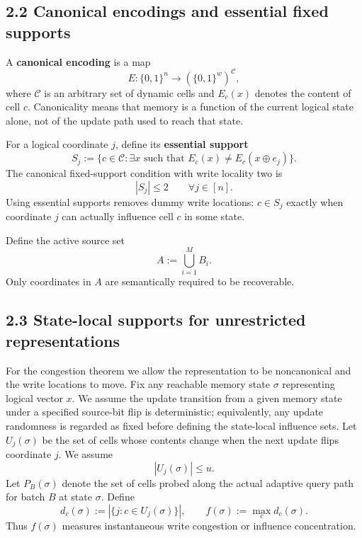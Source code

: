 \documentclass[
]{article}
\begin{document}
\hypertarget{canonical-encodings-and-essential-fixed-supports}{%
\subsection{2.2 Canonical encodings and essential fixed
supports}\label{canonical-encodings-and-essential-fixed-supports}}

A \textbf{canonical encoding} is a map \[
E:\{0,1\}^n\longrightarrow (\{0,1\}^w)^{\mathcal C},
\] where \(\mathcal C\) is an arbitrary set of dynamic cells and
\(E_c(x)\) denotes the content of cell \(c\). Canonicality means that
memory is a function of the current logical state alone, not of the
update path used to reach that state.

For a logical coordinate \(j\), define its \textbf{essential support} \[
S_j
:=
\{c\in\mathcal C:\exists x\text{ such that }E_c(x)\ne E_c(x\oplus e_j)\}.
\] The canonical fixed-support condition with write locality two is \[
|S_j|\le2\qquad\forall j\in[n].
\] Using essential supports removes dummy write locations: \(c\in S_j\)
exactly when coordinate \(j\) can actually influence cell \(c\) in some
state.

Define the active source set \[
A:=\bigcup_{i=1}^M B_i.
\] Only coordinates in \(A\) are semantically required to be
recoverable.

\hypertarget{state-local-supports-for-unrestricted-representations}{%
\subsection{2.3 State-local supports for unrestricted
representations}\label{state-local-supports-for-unrestricted-representations}}

For the congestion theorem we allow the representation to be
noncanonical and the write locations to move. Fix any reachable memory
state \(\sigma\) representing logical vector \(x\). We assume the update
transition from a given memory state under a specified source-bit flip
is deterministic; equivalently, any update randomness is regarded as
fixed before defining the state-local influence sets. Let
\(U_j(\sigma)\) be the set of cells whose contents change when the next
update flips coordinate \(j\). We assume \[
|U_j(\sigma)|\le u.
\] Let \(P_B(\sigma)\) denote the set of cells probed along the actual
adaptive query path for batch \(B\) at state \(\sigma\). Define \[
d_c(\sigma):=|\{j:c\in U_j(\sigma)\}|,
\qquad
f(\sigma):=\max_c d_c(\sigma).
\] Thus \(f(\sigma)\) measures instantaneous write congestion or
influence concentration.
\end{document}
